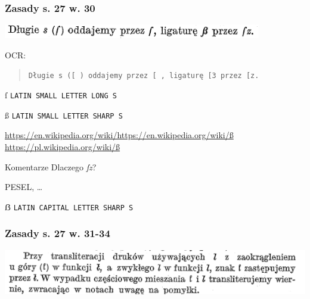 \documentclass[pdfpagemode=UseNone]{beamer}
\newcommand\stpl[1]{{\JunicodePolish\colorbox{black!15}{#1}}}
\begin{document}
\begin{frame}
  \frametitle{Zasady s. 27 w. 30}
  \includegraphics[width=\hsize]{img/Zasady27-30}

  OCR:\\
  \begin{quote}
  \texttt{Długie s ([ ) oddajemy przez [ , ligaturę [3 przez [z.}
\end{quote}

  {\stpl{ſ}}
    \texttt{LATIN SMALL LETTER LONG S}

    {\stpl{ß}}
    \texttt{LATIN SMALL LETTER SHARP S}

    \url{https://en.wikipedia.org/wiki/https://en.wikipedia.org/wiki/ß}
    \url{https://pl.wikipedia.org/wiki/ß}

    \begin{block}{Komentarze}
      Dlaczego \textit{ſz}?

      PESEL, \ldots

      \stpl{ẞ} \texttt{LATIN CAPITAL LETTER SHARP S}
    \end{block}
    
\end{frame}

\begin{frame}
  \frametitle{Zasady s. 27 w. 31-34}
  \includegraphics[width=\hsize]{img/Zasady27-31_34}
\end{frame}
\end{document}

